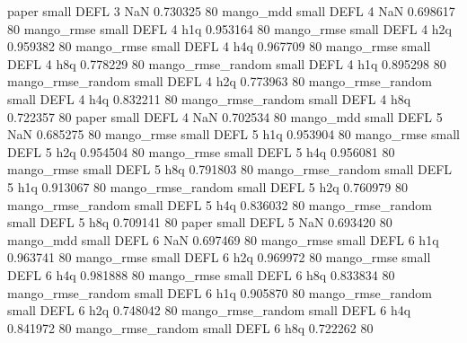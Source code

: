             paper      small     DEFL                 3                  NaN 0.730325 80
        mango_mdd      small     DEFL                 4                  NaN 0.698617 80
       mango_rmse      small     DEFL                 4                  h1q 0.953164 80
       mango_rmse      small     DEFL                 4                  h2q 0.959382 80
       mango_rmse      small     DEFL                 4                  h4q 0.967709 80
       mango_rmse      small     DEFL                 4                  h8q 0.778229 80
mango_rmse_random      small     DEFL                 4                  h1q 0.895298 80
mango_rmse_random      small     DEFL                 4                  h2q 0.773963 80
mango_rmse_random      small     DEFL                 4                  h4q 0.832211 80
mango_rmse_random      small     DEFL                 4                  h8q 0.722357 80
            paper      small     DEFL                 4                  NaN 0.702534 80
        mango_mdd      small     DEFL                 5                  NaN 0.685275 80
       mango_rmse      small     DEFL                 5                  h1q 0.953904 80
       mango_rmse      small     DEFL                 5                  h2q 0.954504 80
       mango_rmse      small     DEFL                 5                  h4q 0.956081 80
       mango_rmse      small     DEFL                 5                  h8q 0.791803 80
mango_rmse_random      small     DEFL                 5                  h1q 0.913067 80
mango_rmse_random      small     DEFL                 5                  h2q 0.760979 80
mango_rmse_random      small     DEFL                 5                  h4q 0.836032 80
mango_rmse_random      small     DEFL                 5                  h8q 0.709141 80
            paper      small     DEFL                 5                  NaN 0.693420 80
        mango_mdd      small     DEFL                 6                  NaN 0.697469 80
       mango_rmse      small     DEFL                 6                  h1q 0.963741 80
       mango_rmse      small     DEFL                 6                  h2q 0.969972 80
       mango_rmse      small     DEFL                 6                  h4q 0.981888 80
       mango_rmse      small     DEFL                 6                  h8q 0.833834 80
mango_rmse_random      small     DEFL                 6                  h1q 0.905870 80
mango_rmse_random      small     DEFL                 6                  h2q 0.748042 80
mango_rmse_random      small     DEFL                 6                  h4q 0.841972 80
mango_rmse_random      small     DEFL                 6                  h8q 0.722262 80

